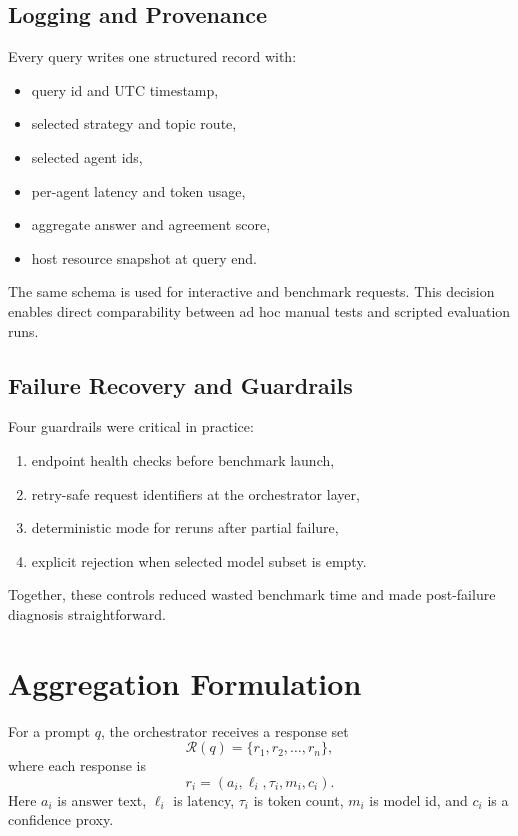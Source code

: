 \documentclass[conference]{IEEEtran}
\begin{document}
\subsection{Logging and Provenance}
Every query writes one structured record with:
\begin{itemize}
  \item query id and UTC timestamp,
  \item selected strategy and topic route,
  \item selected agent ids,
  \item per-agent latency and token usage,
  \item aggregate answer and agreement score,
  \item host resource snapshot at query end.
\end{itemize}

The same schema is used for interactive and benchmark requests. This decision enables direct comparability between ad hoc manual tests and scripted evaluation runs.

\subsection{Failure Recovery and Guardrails}
Four guardrails were critical in practice:
\begin{enumerate}
  \item endpoint health checks before benchmark launch,
  \item retry-safe request identifiers at the orchestrator layer,
  \item deterministic mode for reruns after partial failure,
  \item explicit rejection when selected model subset is empty.
\end{enumerate}

Together, these controls reduced wasted benchmark time and made post-failure diagnosis straightforward.

\section{Aggregation Formulation}
For a prompt $q$, the orchestrator receives a response set
\begin{equation}
\mathcal{R}(q)=\{r_1, r_2, \ldots, r_n\},
\end{equation}
where each response is
\begin{equation}
r_i = (a_i, \ell_i, \tau_i, m_i, c_i).
\end{equation}
Here $a_i$ is answer text, $\ell_i$ is latency, $\tau_i$ is token count, $m_i$ is model id, and $c_i$ is a confidence proxy.
\end{document}
